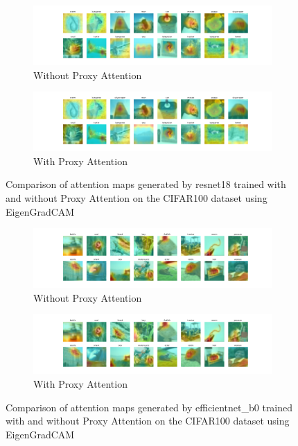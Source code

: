 \documentclass[a4paper,11pt,openright]{book}
\begin{document}
\begin{figure}[!htb]
    \centering
    \begin{subfigure}[b]{1\textwidth}
        \includegraphics[width=\textwidth]{images/cifar100_resnet18_noproxy_3.pdf}
        \caption{Without Proxy Attention}
    \end{subfigure}
    \hfill
    \begin{subfigure}[b]{1\textwidth}
        \includegraphics[width=\textwidth]{images/cifar100_resnet18_proxy_3.pdf}
        \caption{With Proxy Attention}
    \end{subfigure}
    \caption{Comparison of attention maps generated by resnet18 trained with and without Proxy Attention on the CIFAR100 dataset using EigenGradCAM}
\end{figure}




\begin{figure}[!htb]
    \centering
    \begin{subfigure}[b]{1\textwidth}
        \includegraphics[width=\textwidth]{images/cifar100_efficientnet_b0_noproxy_1.pdf}
        \caption{Without Proxy Attention}
    \end{subfigure}
    \hfill
    \begin{subfigure}[b]{1\textwidth}
        \includegraphics[width=\textwidth]{images/cifar100_efficientnet_b0_proxy_1.pdf}
        \caption{With Proxy Attention}
    \end{subfigure}
    \caption{Comparison of attention maps generated by efficientnet\_b0 trained with and without Proxy Attention on the CIFAR100 dataset using EigenGradCAM}
\end{figure}
\end{document}

